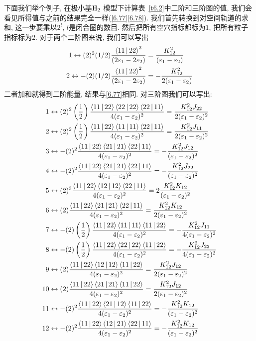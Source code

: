 下面我们举个例子, 
在极小基$\mathrm{H}_2$ 模型下计算表~\ref{t6.2}中二阶和三阶图的值, 
我们会看见所得值与之前的结果完全一样(\ref{6.77}\ref{6.78}). 
我们首先转换到对空间轨道的求和, 
这一步要乘以$2^l$, 
$l$是闭合圈的数目. 
然后把所有空穴指标都标为$1$, 
把所有粒子指标标为$2$. 
对于两个二阶图来说, 
我们可以写出
\begin{align*}
1\leftrightarrow (2)^2(1/2)\frac{\Braket{11|22}^2}{(2\varepsilon_1-2\varepsilon_2)} & = \frac{K_{12}^2}{(\varepsilon_1-\varepsilon_2)}\\
2\leftrightarrow -(2)(1/2)\frac{\Braket{11|22}^2}{(2\varepsilon_1-2\varepsilon_2)} & = -\frac{K_{12}^2}{2(\varepsilon_1-\varepsilon_2)}
\end{align*}
二者加和就得到二阶能量, 
结果与\ref{6.77}相同. 
对三阶图我们可以写出:
\begin{align*}
1&\leftrightarrow (2)^2\left( \frac{1}{2} \right) \frac{\Braket{11|22}\Braket{22|22}\Braket{22|11}}{4(\varepsilon_1 - \varepsilon_2)^2}  = \frac{K_{12}^2J_{22}}{2(\varepsilon_1 - \varepsilon_2)^2}\\
2&\leftrightarrow (2)^2\left( \frac{1}{2} \right) \frac{\Braket{11|22}\Braket{11|11}\Braket{22|11}}{4(\varepsilon_1 - \varepsilon_2)^2}  = \frac{K_{12}^2J_{11}}{2(\varepsilon_1 - \varepsilon_2)^2}\\
3&\leftrightarrow -(2)^2 \frac{\Braket{11|22}\Braket{21|21}\Braket{22|11}}{4(\varepsilon_1 - \varepsilon_2)^2}  = -\frac{K_{12}^2J_{12}}{(\varepsilon_1 - \varepsilon_2)^2}\\
4&\leftrightarrow -(2)^2 \frac{\Braket{11|22}\Braket{21|21}\Braket{22|11}}{4(\varepsilon_1 - \varepsilon_2)^2}  = -\frac{K_{12}^2J_{22}}{(\varepsilon_1 - \varepsilon_2)^2}\\
5&\leftrightarrow (2)^3 \frac{\Braket{11|22}\Braket{12|12}\Braket{22|11}}{4(\varepsilon_1 - \varepsilon_2)^2}  = 2\frac{K_{12}^2K_{12}}{(\varepsilon_1 - \varepsilon_2)^2}\\
6&\leftrightarrow (2) \frac{\Braket{11|22}\Braket{21|21}\Braket{22|11}}{4(\varepsilon_1 - \varepsilon_2)^2}  = \frac{K_{12}^2K_{12}}{2(\varepsilon_1 - \varepsilon_2)^2}\\
7&\leftrightarrow -(2)\left( \frac{1}{2} \right) \frac{\Braket{11|22}\Braket{11|11}\Braket{11|22}}{4(\varepsilon_1 - \varepsilon_2)^2}  = -\frac{K_{12}^2J_{11}}{4(\varepsilon_1 - \varepsilon_2)^2}\\
8&\leftrightarrow -(2)\left( \frac{1}{2} \right) \frac{\Braket{11|22}\Braket{22|22}\Braket{11|22}}{4(\varepsilon_1 - \varepsilon_2)^2}  = -\frac{K_{12}^2J_{22}}{4(\varepsilon_1 - \varepsilon_2)^2}\\
9&\leftrightarrow (2) \frac{\Braket{11|22}\Braket{12|12}\Braket{11|22}}{4(\varepsilon_1 - \varepsilon_2)^2}  = \frac{K_{12}^2J_{12}}{2(\varepsilon_1 - \varepsilon_2)^2}\\
10&\leftrightarrow (2) \frac{\Braket{11|22}\Braket{21|21}\Braket{11|22}}{4(\varepsilon_1 - \varepsilon_2)^2}  = \frac{K_{12}^2J_{12}}{2(\varepsilon_1 - \varepsilon_2)^2}\\
11&\leftrightarrow -(2)^2 \frac{\Braket{11|22}\Braket{21|12}\Braket{11|22}}{4(\varepsilon_1 - \varepsilon_2)^2}  = -\frac{K_{12}^2K_{12}}{(\varepsilon_1 - \varepsilon_2)^2}\\
12&\leftrightarrow -(2)^2 \frac{\Braket{11|22}\Braket{12|21}\Braket{22|11}}{4(\varepsilon_1 - \varepsilon_2)^2}  = -\frac{K_{12}^2K_{12}}{(\varepsilon_1 - \varepsilon_2)^2}
\end{align*}
